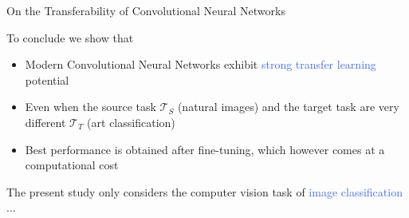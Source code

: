 \documentclass{beamer}
\newcommand*\circled[1]{\tikz[baseline=(char.base)]{
            \node[shape=circle,draw,inner sep=0.5pt] (char) {#1};}}
\begin{document}

\begin{frame}{On the Transferability of Convolutional Neural Networks}

	\bigskip

	To conclude we show that
	
	\bigskip

	\begin{itemize}
		\item Modern Convolutional Neural Networks exhibit \textcolor{RoyalBlue}{strong transfer learning} potential
		\item Even when the source task $\mathcal{T}_S$ (natural images) and the target task are very different $\mathcal{T}_T$ (art classification)
		\item Best performance is obtained after fine-tuning, which however comes at a computational cost
	\end{itemize}

	\bigskip

	The present study only considers the computer vision task of \textcolor{RoyalBlue}{image classification} ...

\end{frame}
\end{document}
